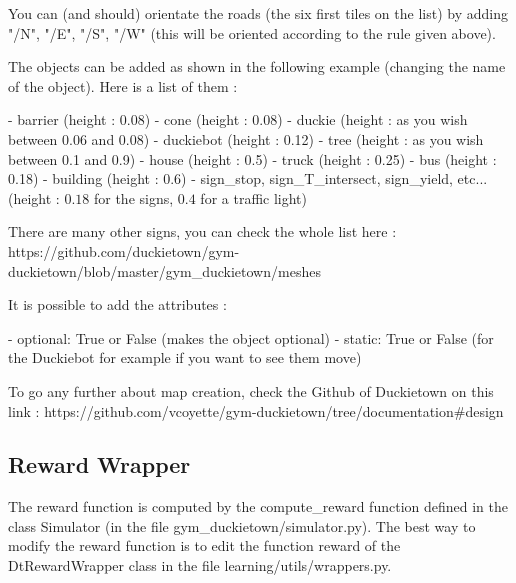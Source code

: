 \documentclass[12pt]{article}
\begin{document}
You can (and should) orientate the roads (the six first tiles on the list) by adding "/N", "/E", "/S", "/W" (this will be oriented according to the rule given above).\newline

The objects can be added as shown in the following example (changing the name of the object). Here is a list of them :\newline

\noindent- barrier (height : 0.08)\newline
\noindent- cone (height : 0.08)\newline
\noindent- duckie (height : as you wish between 0.06 and 0.08)\newline
\noindent- duckiebot (height : 0.12)\newline
\noindent- tree (height : as you wish between 0.1 and 0.9)\newline
\noindent- house (height : 0.5)\newline
\noindent- truck (height : 0.25)\newline
\noindent- bus (height : 0.18)\newline
\noindent- building (height : 0.6)\newline
\noindent- sign\_stop, sign\_T\_intersect, sign\_yield, etc... (height : $0.18$ for the signs, $0.4$ for a traffic light)\newline

There are many other signs, you can check the whole list here :\newline
https://github.com/duckietown/gym-duckietown/blob/master/gym\_duckietown/meshes\newline

It is possible to add the attributes : \newline

\noindent- optional: True or False (makes the object optional)\newline
\noindent- static: True or False (for the Duckiebot for example if you want to see them move)\newline

To go any further about map creation, check the Github of Duckietown on this link : https://github.com/vcoyette/gym-duckietown/tree/documentation#design\newline

\subsection{Reward Wrapper}
The reward function is computed by the compute\_reward function defined in the class Simulator (in the file gym\_duckietown/simulator.py). The best way to modify the reward function is to edit the function reward of the DtRewardWrapper class in the file learning/utils/wrappers.py.
\end{document}

